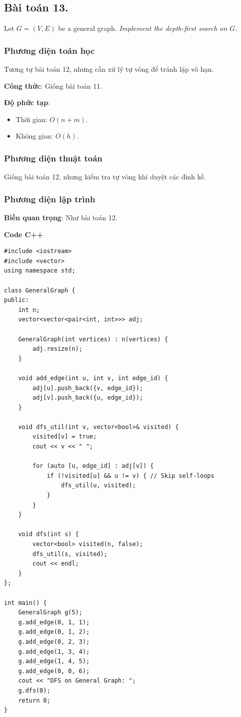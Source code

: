 \documentclass[a4paper,12pt]{article}
\begin{document}
\subsection{Bài toán 13.} Let $G = (V, E)$ be a general graph. \textit{Implement the depth-first search on $G$.}

\subsubsection{Phương diện toán học}
Tương tự bài toán 12, nhưng cần xử lý tự vòng để tránh lặp vô hạn.

\textbf{Công thức}: Giống bài toán 11.

\textbf{Độ phức tạp}: 
\begin{itemize}
    \item Thời gian: \( O(n + m) \).
    \item Không gian: \( O(h) \).
\end{itemize}

\subsubsection{Phương diện thuật toán}
Giống bài toán 12, nhưng kiểm tra tự vòng khi duyệt các đỉnh kề.

\subsubsection{Phương diện lập trình}
\textbf{Biến quan trọng}: Như bài toán 12.

\textbf{Code C++}
\lstset{language=C++}
\begin{lstlisting}
#include <iostream>
#include <vector>
using namespace std;

class GeneralGraph {
public:
    int n;
    vector<vector<pair<int, int>>> adj;

    GeneralGraph(int vertices) : n(vertices) {
        adj.resize(n);
    }

    void add_edge(int u, int v, int edge_id) {
        adj[u].push_back({v, edge_id});
        adj[v].push_back({u, edge_id});
    }

    void dfs_util(int v, vector<bool>& visited) {
        visited[v] = true;
        cout << v << " ";

        for (auto [u, edge_id] : adj[v]) {
            if (!visited[u] && u != v) { // Skip self-loops
                dfs_util(u, visited);
            }
        }
    }

    void dfs(int s) {
        vector<bool> visited(n, false);
        dfs_util(s, visited);
        cout << endl;
    }
};

int main() {
    GeneralGraph g(5);
    g.add_edge(0, 1, 1);
    g.add_edge(0, 1, 2);
    g.add_edge(0, 2, 3);
    g.add_edge(1, 3, 4);
    g.add_edge(1, 4, 5);
    g.add_edge(0, 0, 6);
    cout << "DFS on General Graph: ";
    g.dfs(0);
    return 0;
}
\end{lstlisting}
\end{document}
